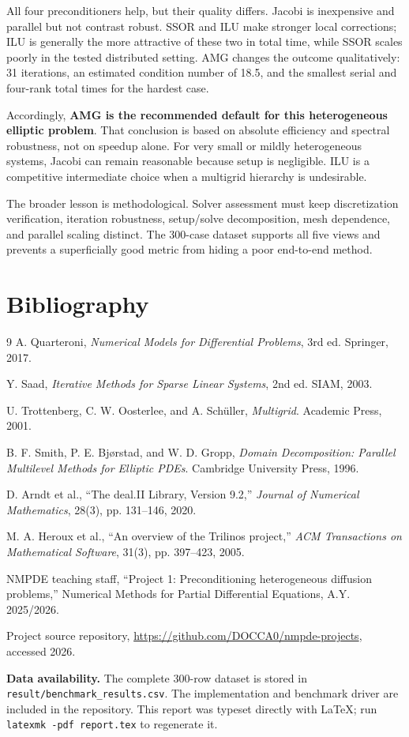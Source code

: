 \documentclass[10pt,a4paper]{article}
\begin{document}
All four preconditioners help, but their quality differs. Jacobi is inexpensive and parallel but not
contrast robust. SSOR and ILU make stronger local corrections; ILU is generally the more attractive
of these two in total time, while SSOR scales poorly in the tested distributed setting. AMG changes
the outcome qualitatively: 31 iterations, an estimated condition number of 18.5, and the smallest
serial and four-rank total times for the hardest case.

Accordingly, \textbf{AMG is the recommended default for this heterogeneous elliptic problem}.
That conclusion is based on absolute efficiency and spectral robustness, not on speedup alone.
For very small or mildly heterogeneous systems, Jacobi can remain reasonable because setup is
negligible. ILU is a competitive intermediate choice when a multigrid hierarchy is undesirable.

The broader lesson is methodological. Solver assessment must keep discretization verification,
iteration robustness, setup/solve decomposition, mesh dependence, and parallel scaling distinct.
The 300-case dataset supports all five views and prevents a superficially good metric from hiding a
poor end-to-end method.

\newpage
\section{Bibliography}
\begin{thebibliography}{9}
A. Quarteroni,
\emph{Numerical Models for Differential Problems}, 3rd ed.
Springer, 2017.

Y. Saad,
\emph{Iterative Methods for Sparse Linear Systems}, 2nd ed.
SIAM, 2003.

U. Trottenberg, C. W. Oosterlee, and A. Sch\"uller,
\emph{Multigrid}. Academic Press, 2001.

B. F. Smith, P. E. Bj\o rstad, and W. D. Gropp,
\emph{Domain Decomposition: Parallel Multilevel Methods for Elliptic PDEs}.
Cambridge University Press, 1996.

D. Arndt et al., ``The deal.II Library, Version 9.2,''
\emph{Journal of Numerical Mathematics}, 28(3), pp. 131--146, 2020.

M. A. Heroux et al., ``An overview of the Trilinos project,''
\emph{ACM Transactions on Mathematical Software}, 31(3), pp. 397--423, 2005.

NMPDE teaching staff, ``Project 1: Preconditioning heterogeneous diffusion problems,''
Numerical Methods for Partial Differential Equations, A.Y. 2025/2026.

Project source repository, \url{https://github.com/DOCCA0/nmpde-projects}, accessed 2026.
\end{thebibliography}

\vfill
\small
\textbf{Data availability.} The complete 300-row dataset is stored in
\texttt{result/benchmark\_results.csv}. The implementation and benchmark driver are included in
the repository. This report was typeset directly with LaTeX; run \texttt{latexmk -pdf report.tex}
to regenerate it.
\end{document}
